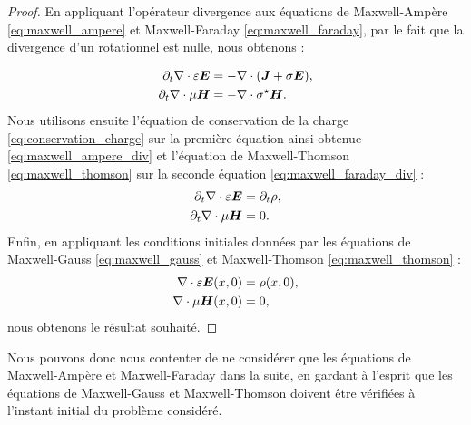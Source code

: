 \begin{proof}
	\begin{sloppypar}
	En appliquant l'opérateur divergence aux équations de Maxwell-Ampère
	\eqref{eq:maxwell_ampere} et Maxwell-Faraday \eqref{eq:maxwell_faraday},
	par le fait que la divergence d'un rotationnel est nulle, nous obtenons :
	\end{sloppypar}
	\begin{subequations}
		\begin{align}
			\partial_{t} \nabla\cdot \varepsilon \bm{E} &= - \nabla\cdot (\bm{J} + \sigma \bm{E})
			\label{eq:maxwell_ampere_div} ,
			\\
			\partial_{t} \nabla\cdot \mu \bm{H} &= - \nabla\cdot \sigma^\star \bm{H}
			\label{eq:maxwell_faraday_div} .
		\end{align}
	\end{subequations}
	Nous utilisons ensuite l'équation de conservation de la charge
	\eqref{eq:conservation_charge} sur la première 	équation ainsi obtenue
	\eqref{eq:maxwell_ampere_div} et l'équation de Maxwell-Thomson \eqref{eq:maxwell_thomson}
	sur la seconde équation \eqref{eq:maxwell_faraday_div} :
	\begin{subequations}
		\begin{align}
			\partial_{t} \nabla\cdot \varepsilon \bm{E} &= \partial_{t} \rho ,
			\\
			\partial_{t} \nabla\cdot \mu \bm{H} &= 0 .
		\end{align}
	\end{subequations}
	Enfin, en appliquant les conditions initiales données par les équations de
	Maxwell-Gauss \eqref{eq:maxwell_gauss} et Maxwell-Thomson \eqref{eq:maxwell_thomson} :
	\begin{subequations}
		\begin{align}
			\nabla\cdot \varepsilon \bm{E} (x,0) &= \rho (x,0) ,
			\\
			\nabla\cdot \mu \bm{H} (x,0) &= 0 ,
		\end{align}
	\end{subequations}
	nous obtenons le résultat souhaité.
\end{proof}


Nous pouvons donc nous contenter de ne considérer que les équations de
Maxwell-Ampère et Maxwell-Faraday dans la suite, en gardant à l'esprit que
les équations de Maxwell-Gauss et Maxwell-Thomson doivent être vérifiées
à l'instant initial du problème considéré.
\\



